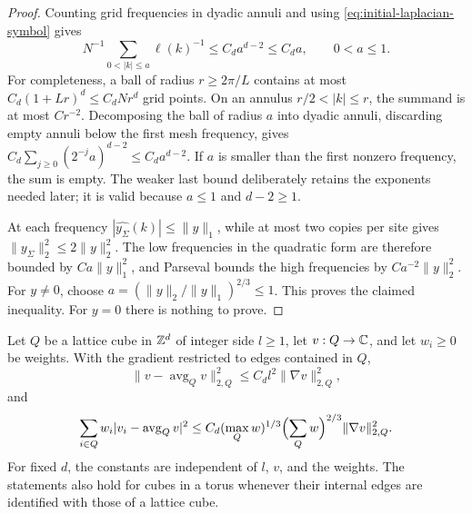 \begin{proof}
Counting grid frequencies in dyadic annuli and using
\eqref{eq:initial-laplacian-symbol} gives
\begin{equation}\label{eq:initial-frequency-sum}
 N^{-1}\sum_{0<|k|\le a}\ell(k)^{-1}
 \le C_d a^{d-2}\le C_d a,
 \qquad 0<a\le1.
\end{equation}
For completeness, a ball of radius $r\ge2\pi/L$ contains at most
$C_d(1+Lr)^d\le C_dNr^d$ grid points. On an annulus
$r/2<|k|\le r$, the summand is at most $C r^{-2}$. Decomposing the
ball of radius $a$ into dyadic annuli, discarding empty annuli below
the first mesh frequency, gives
$C_d\sum_{j\ge0}(2^{-j}a)^{d-2}\le C_da^{d-2}$.
If $a$ is smaller than the first nonzero frequency, the sum is empty.
The weaker last bound deliberately retains the exponents needed later;
it is valid because $a\le1$ and $d-2\ge1$.

At each frequency $|\widehat{y_\Sigma}(k)|\le\|y\|_1$, while at most
two copies per site gives $\|y_\Sigma\|_2^2\le2\|y\|_2^2$.
The low frequencies in the quadratic form are therefore bounded by
$Ca\|y\|_1^2$, and Parseval bounds the high frequencies by
$Ca^{-2}\|y\|_2^2$.  For $y\ne0$, choose
$a=(\|y\|_2/\|y\|_1)^{2/3}\le1$.  This proves the claimed
inequality.  For $y=0$ there is nothing to prove.
\end{proof}

\begin{lemma}\label{lem:cube-weight}
Let $Q$ be a lattice cube in $\mathbb Z^d$ of integer side $l\ge1$,
let $v:Q\to\mathbb C$, and let $w_i\ge0$ be weights. With the gradient
restricted to edges contained in $Q$,
\[
 \|v-\operatorname{avg}_Qv\|_{2,Q}^2
 \le C_d l^2\|\nabla v\|_{2,Q}^2,
\]
and
\begin{equation}\label{eq:initial-weighted-cube}
 \sum_{i\in Q}w_i|v_i-\operatorname{avg}_Qv|^2
 \le C_d(\max_Q w)^{1/3}\Bigl(\sum_Qw\Bigr)^{2/3}
          \|\nabla v\|_{2,Q}^2.
\end{equation}
For fixed $d$, the constants are independent of $l$, $v$, and the
weights. The statements also hold for cubes in a torus whenever their
internal edges are identified with those of a lattice cube.
\end{lemma}

